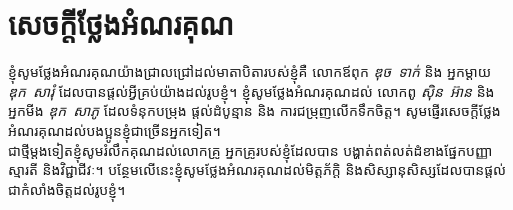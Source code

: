 \chapter*{សេចក្ដីថ្លែងអំណរគុណ}
ខ្ញុំសូមថ្លែងអំណរគុណយ៉ាងជ្រាលជ្រៅដល់មាតាបិតារបស់ខ្ញុំគឺ លោកឪពុក \emph{ឌុច~ទាក់} និង អ្នកម្ដាយ \emph{ឌុក~សារុំ} ដែលបានផ្ដល់អ្វីគ្រប់យ៉ាងដល់រូបខ្ញុំ។ ខ្ញុំសូមថ្លែងអំណរគុណដល់ លោកពូ \emph{ស៊ិន~អ៊ាន} និង អ្នកមីង \emph{ឌុក~សាភូ} ដែលទំនុកបម្រុង ផ្ដល់ដំបូន្មាន និង ការជម្រុញលើកទឹកចិត្ត។ សូមផ្ញើរសេចក្ដីថ្លែងអំណរគុណដល់បងប្អូនខ្ញុំជាច្រើនអ្នកទៀត។
\\[1em]
ជាថ្មីម្ដងទៀតខ្ញុំសូមរំលឹកគុណដល់លោកគ្រូ អ្នកគ្រូរបស់ខ្ញុំដែលបាន បង្ហាត់ពត់លត់ដំខាងផ្នែកបញ្ញាស្មារតី និងវិជ្ជាជីវៈ។ បន្ថែមលើនេះខ្ញុំសូមថ្លែងអំណរគុណដល់មិត្តភ័ក្ដិ និងសិស្សានុសិស្សដែលបានផ្ដល់ជាកំលាំងចិត្តដល់រូបខ្ញុំ។